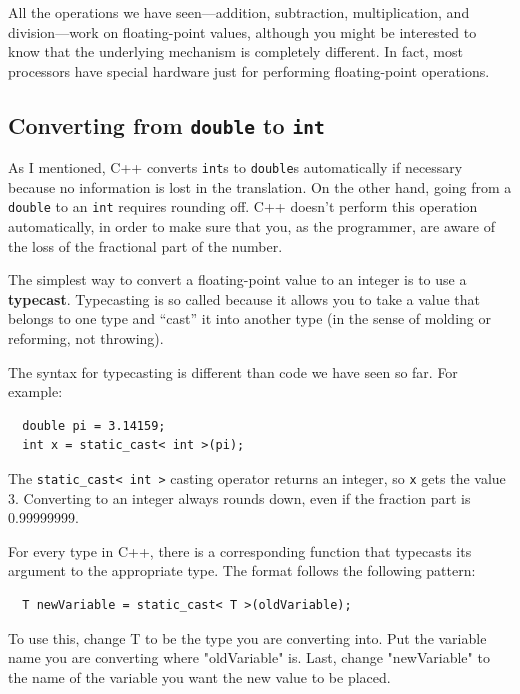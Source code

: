 
All the operations we have seen---addition, subtraction,
multiplication, and division---work on floating-point values,
although you might be interested to know that the underlying mechanism
is completely different.  In fact, most processors have special
hardware just for performing floating-point operations.

\subsection{Converting from {\tt double} to {\tt int}}
\label{rounding}

As I mentioned, C++ converts {\tt int}s
to {\tt double}s automatically if necessary because no
information is lost in the translation.  On the other hand,
going from a {\tt double} to an {\tt int} requires rounding
off.  C++ doesn't perform this operation automatically, in
order to make sure that you, as the programmer, are aware
of the loss of the fractional part of the number.

The simplest way to convert a floating-point value to an integer is to
use a {\bf typecast}.  Typecasting is so called because it allows you
to take a value that belongs to one type and ``cast'' it into another
type (in the sense of molding or reforming, not throwing).

The syntax for typecasting is different than code we have seen so far.  For example:

\begin{lstlisting}
  double pi = 3.14159;
  int x = static_cast< int >(pi);
\end{lstlisting}
%
The {\tt static\_cast< int >} casting operator returns an integer, so {\tt x} gets the value
3.  Converting to an integer always rounds down, even if the fraction
part is 0.99999999.

For every type in C++, there is a corresponding function that
typecasts its argument to the appropriate type. The format follows the following pattern:

\begin{verbatim}
  T newVariable = static_cast< T >(oldVariable);
\end{verbatim}
To use this, change T to be the type you are converting into. Put the variable name you are converting where "oldVariable" is. Last, change "newVariable" to the name of the variable you want the new value to be placed. 

